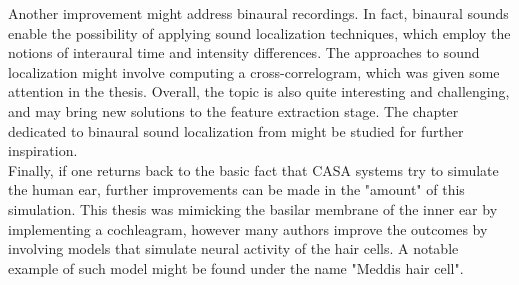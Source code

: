 Another improvement might address binaural recordings. In fact, binaural sounds enable the possibility of applying sound localization techniques, which employ the notions of interaural time and intensity differences. The approaches to sound localization might involve computing a cross-correlogram, which was given some attention in the thesis. Overall, the topic is also quite interesting and challenging, and may bring new solutions to the feature extraction stage. The chapter dedicated to binaural sound localization from \cite{Wang2006} might be studied for further inspiration.\\

Finally, if one returns back to the basic fact that CASA systems try to simulate the human ear, further improvements can be made in the "amount" of this simulation. This thesis was mimicking the basilar membrane of the inner ear by implementing a cochleagram, however many authors improve the outcomes by involving models that simulate neural activity of the hair cells. A notable example of such model might be found under the name "Meddis hair cell".
